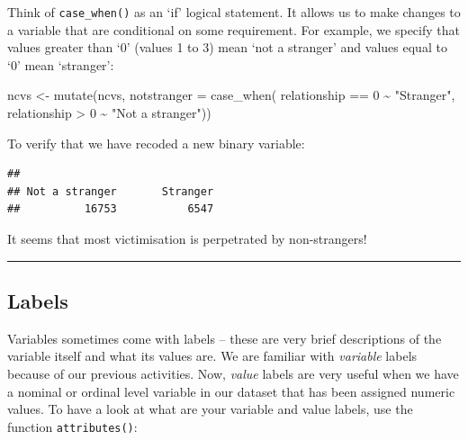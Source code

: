 \documentclass[
]{book}
\newenvironment{Shaded}{\begin{snugshade}}{\end{snugshade}}
\newcommand{\AttributeTok}[1]{\textcolor[rgb]{0.77,0.63,0.00}{#1}}
\newcommand{\DecValTok}[1]{\textcolor[rgb]{0.00,0.00,0.81}{#1}}
\newcommand{\FunctionTok}[1]{\textcolor[rgb]{0.00,0.00,0.00}{#1}}
\newcommand{\NormalTok}[1]{#1}
\newcommand{\OtherTok}[1]{\textcolor[rgb]{0.56,0.35,0.01}{#1}}
\newcommand{\SpecialCharTok}[1]{\textcolor[rgb]{0.00,0.00,0.00}{#1}}
\newcommand{\StringTok}[1]{\textcolor[rgb]{0.31,0.60,0.02}{#1}}
\begin{document}
Think of \texttt{case\_when()} as an `if' logical statement. It allows us to make changes to a variable that are conditional on some requirement. For example, we specify that values greater than `0' (values 1 to 3) mean `not a stranger' and values equal to `0' mean `stranger':

\begin{Shaded}
\begin{Highlighting}[]
\NormalTok{ncvs }\OtherTok{\textless{}{-}} \FunctionTok{mutate}\NormalTok{(ncvs, }
               \AttributeTok{notstranger =} \FunctionTok{case\_when}\NormalTok{(}
\NormalTok{                 relationship }\SpecialCharTok{==} \DecValTok{0} \SpecialCharTok{\textasciitilde{}} \StringTok{"Stranger"}\NormalTok{,}
\NormalTok{                 relationship }\SpecialCharTok{\textgreater{}} \DecValTok{0} \SpecialCharTok{\textasciitilde{}} \StringTok{"Not a stranger"}\NormalTok{))}
\end{Highlighting}
\end{Shaded}

To verify that we have recoded a new binary variable:

\begin{Shaded}
\end{Shaded}

\begin{verbatim}
## 
## Not a stranger       Stranger 
##          16753           6547
\end{verbatim}

It seems that most victimisation is perpetrated by non-strangers!

\begin{center}\rule{0.5\linewidth}{0.5pt}\end{center}

\hypertarget{labels}{%
\subsection{Labels}\label{labels}}

Variables sometimes come with labels -- these are very brief descriptions of the variable itself and what its values are. We are familiar with \emph{variable} labels because of our previous activities. Now, \emph{value} labels are very useful when we have a nominal or ordinal level variable in our dataset that has been assigned numeric values. To have a look at what are your variable and value labels, use the function \texttt{attributes()}:
\end{document}
